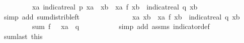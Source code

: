 \begin{isabellebody}
\ \ \ \ \ \ \ \ \ {\isacharparenleft}{\kern0pt}{\isasymSum}xa{\isasymin}{\isasymK}{\isachardot}{\kern0pt}\ indicat{\isacharunderscore}{\kern0pt}real\ {\isacharbraceleft}{\kern0pt}p{\isacharbraceright}{\kern0pt}\ xa\ {\isacharasterisk}{\kern0pt}\ {\isacharparenleft}{\kern0pt}{\isasymSum}xb{\isasymin}{\isacharparenleft}{\kern0pt}{\isasymK}\ {\isacharminus}{\kern0pt}\ {\isacharbraceleft}{\kern0pt}xa{\isacharbraceright}{\kern0pt}{\isacharparenright}{\kern0pt}{\isachardot}{\kern0pt}\ {\isacharparenleft}{\kern0pt}{\isacharquery}{\kern0pt}f{\isacharunderscore}{\kern0pt}{}\ xb{\isacharparenright}{\kern0pt}\ {\isacharasterisk}{\kern0pt}\ indicat{\isacharunderscore}{\kern0pt}real\ {\isacharbraceleft}{\kern0pt}q{\isacharbraceright}{\kern0pt}\ xb{\isacharparenright}{\kern0pt}{\isacharparenright}{\kern0pt}{\isachardoublequoteclose}\ \isanewline
\ \ \ \ \ \ \ \ \isamarkupfalse%
\ {\isacharparenleft}{\kern0pt}simp\ add{\isacharcolon}{\kern0pt}\ sum{\isacharunderscore}{\kern0pt}distrib{\isacharunderscore}{\kern0pt}left{\isacharparenright}{\kern0pt}\isanewline
\ \ \ \ \ \ \isanewline
\ \ \ \ \ \ \isamarkupfalse%
\ {\isachardoublequoteopen}{\isasymAnd}xa{\isachardot}{\kern0pt}\ {\isacharparenleft}{\kern0pt}{\isasymSum}xb{\isasymin}{\isasymK}\ {\isacharminus}{\kern0pt}\ {\isacharbraceleft}{\kern0pt}xa{\isacharbraceright}{\kern0pt}{\isachardot}{\kern0pt}\ {\isacharparenleft}{\kern0pt}{\isacharquery}{\kern0pt}f{\isacharunderscore}{\kern0pt}{}\ xb{\isacharparenright}{\kern0pt}\ {\isacharasterisk}{\kern0pt}\ indicat{\isacharunderscore}{\kern0pt}real\ {\isacharbraceleft}{\kern0pt}q{\isacharbraceright}{\kern0pt}\ xb{\isacharparenright}{\kern0pt}\isanewline
\ \ \ \ \ \ \ \ {\isacharequal}{\kern0pt}\ sum\ {\isacharquery}{\kern0pt}f{\isacharunderscore}{\kern0pt}{}\ {\isacharparenleft}{\kern0pt}{\isacharparenleft}{\kern0pt}{\isasymK}\ {\isacharminus}{\kern0pt}\ {\isacharbraceleft}{\kern0pt}xa{\isacharbraceright}{\kern0pt}{\isacharparenright}{\kern0pt}\ {\isasyminter}\ {\isacharbraceleft}{\kern0pt}q{\isacharbraceright}{\kern0pt}{\isacharparenright}{\kern0pt}{\isachardoublequoteclose}\ \isanewline
\ \ \ \ \ \ \ \ \isamarkupfalse%
\ {\isacharparenleft}{\kern0pt}simp\ add{\isacharcolon}{\kern0pt}\ assms{\isacharparenleft}{\kern0pt}{}{\isacharparenright}{\kern0pt}\ indicator{\isacharunderscore}{\kern0pt}def{\isacharparenright}{\kern0pt}\isanewline
\ \ \ \ \ \ \isamarkupfalse%
\ sum{\isacharunderscore}{\kern0pt}last\ this\ \isamarkupfalse%

\end{isabellebody}
